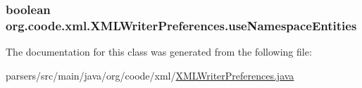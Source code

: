 \hypertarget{classorg_1_1coode_1_1xml_1_1_x_m_l_writer_preferences_a8a87140e3e56abb5f86297dc6582be8c}{
\subsubsection[{use\-Namespace\-Entities}]{\setlength{\rightskip}{0pt plus 5cm}boolean org.\-coode.\-xml.\-X\-M\-L\-Writer\-Preferences.\-use\-Namespace\-Entities\hspace{0.3cm}{\ttfamily [private]}}}\label{classorg_1_1coode_1_1xml_1_1_x_m_l_writer_preferences_a8a87140e3e56abb5f86297dc6582be8c}


The documentation for this class was generated from the following file\-:\begin{DoxyCompactItemize}
\item 
parsers/src/main/java/org/coode/xml/\hyperlink{_x_m_l_writer_preferences_8java}{X\-M\-L\-Writer\-Preferences.\-java}\end{DoxyCompactItemize}
